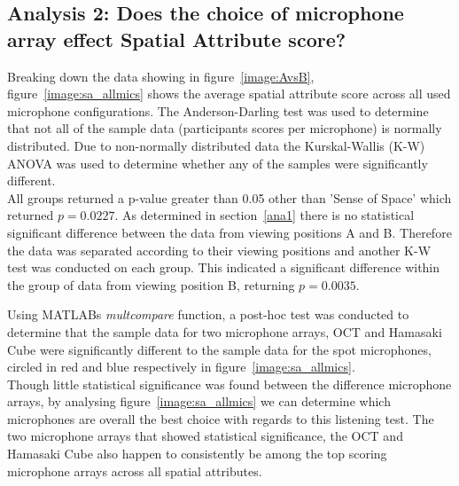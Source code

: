 















\subsection{Analysis 2: Does the choice of microphone array effect Spatial Attribute score?}
	\label{ana2}

		Breaking down the data showing in figure~\ref{image:AvsB}, figure~\ref{image:sa_allmics} shows the average spatial attribute score across all used microphone configurations. The Anderson-Darling test was used to determine that not all of the sample data (participants scores per microphone) is normally distributed. Due to non-normally distributed data the Kurskal-Wallis (K-W) ANOVA was used to determine whether any of the samples were significantly different. \\

		All groups returned a p-value greater than 0.05 other than 'Sense of Space' which returned $p = 0.0227 $. As determined in section~\ref{ana1} there is no statistical significant difference between the data from viewing positions A and B. Therefore the data was separated according to their viewing positions and another K-W test was conducted on each group. This indicated a significant difference within the group of data from viewing position B, returning $ p = 0.0035 $.

		Using MATLABs \textit{multcompare} function, a post-hoc test was conducted to determine that the sample data for two microphone arrays, OCT and Hamasaki Cube were significantly different to the sample data for the spot microphones, circled in red and blue respectively in figure~\ref{image:sa_allmics}. \\

		Though little statistical significance was found between the difference microphone arrays, by analysing figure~\ref{image:sa_allmics} we can determine which microphones are overall the best choice with regards to this listening test. The two microphone arrays that showed statistical significance, the OCT and Hamasaki Cube also happen to consistently be among the top scoring microphone arrays across all spatial attributes.

